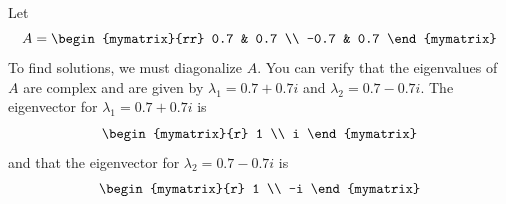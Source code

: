 \begin{solution}
Let
\begin{equation*}
A
=
\begin{mymatrix}{rr}
0.7 & 0.7 \\
-0.7 & 0.7
\end{mymatrix}
\end{equation*}
To find solutions, we must diagonalize $A$. You can verify that the eigenvalues of $A$ are complex and are given by  $\lambda_1 = 0.7+0.7i$ and $\lambda_2 = 0.7-0.7i$. The eigenvector for $\lambda_1 = 0.7+0.7i$ is 
\begin{equation*}
\begin{mymatrix}{r}
1 \\
i
\end{mymatrix} 
\end{equation*}
and that the eigenvector for $\lambda_2 = 0.7-0.7i$ is
\begin{equation*}
\begin{mymatrix}{r}
1 \\
-i
\end{mymatrix}  
\end{equation*}


\end{solution}
